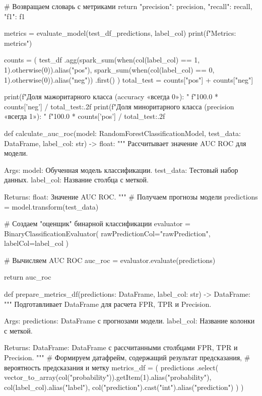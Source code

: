 \begin{code}
    # Возвращаем словарь с метриками
    return {
        "precision": precision,
        "recall": recall,
        "f1": f1
    }

metrics = evaluate_model(test_df_predictions, label_col)
print(f"Metrics: {metrics}")

counts = (
    test_df
    .agg(spark_sum(when(col(label_col) == 1, 1).otherwise(0)).alias("pos"),
         spark_sum(when(col(label_col) == 0, 1).otherwise(0)).alias("neg"))
    .first()
)
total_test = counts["pos"] + counts["neg"]

print(f"Доля мажоритарного класса (accuracy «всегда 0»): "
      f"{100.0 * counts['neg'] / total_test:.2f} %
print(f"Доля миноритарного класса (precision «всегда 1»): "
      f"{100.0 * counts['pos'] / total_test:.2f} %
    
def calculate_auc_roc(model: RandomForestClassificationModel,
                      test_data: DataFrame,
                      label_col: str) -> float:
    """
    Рассчитывает значение AUC ROC для модели.

    Args:
        model: Обученная модель классификации.
        test_data: Тестовый набор данных.
        label_col: Название столбца с меткой.

    Returns:
        float: Значение AUC ROC.
    """
    # Получаем прогнозы модели
    predictions = model.transform(test_data)

    # Создаем "оценщик" бинарной классификации
    evaluator = BinaryClassificationEvaluator(
        rawPredictionCol="rawPrediction",
        labelCol=label_col
    )

    # Вычисляем AUC ROC
    auc_roc = evaluator.evaluate(predictions)

    return auc_roc

def prepare_metrics_df(predictions: DataFrame, label_col: str) -> DataFrame:
    """
    Подготавливает DataFrame для расчета FPR, TPR и Precision.

    Args:
        predictions: DataFrame с прогнозами модели.
        label_col: Название колонки с меткой.

    Returns:
        DataFrame: DataFrame с рассчитанными столбцами FPR, TPR и Precision.
    """
    # Формируем датафрейм, содержащий результат предсказания,
    # вероятность предсказания и метку
    metrics_df = (
        predictions
        .select(
            vector_to_array(col("probability")).getItem(1).alias("probability"),
            col(label_col).alias("label"),
            col("prediction").cast("int").alias("prediction")
        )
    )


\end{code}
